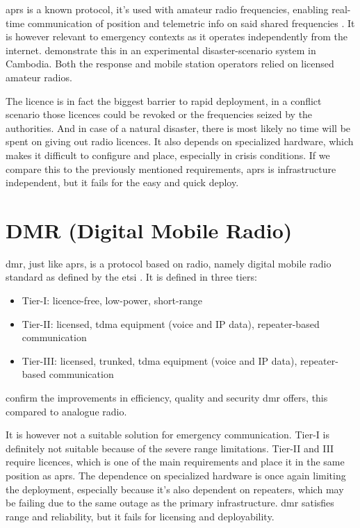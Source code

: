 \gls{aprs} is a known protocol, it's used with amateur radio frequencies, enabling real-time communication of position and telemetric info on said shared frequencies \autocite{UN2023APRS}.
It is however relevant to emergency contexts as it operates independently from the internet. \textcite{UN2023APRS} demonstrate this in an experimental disaster-scenario system in Cambodia. Both the response and mobile station operators relied on licensed amateur radios.

The licence is in fact the biggest barrier to rapid deployment, in a conflict scenario those licences could be revoked or the frequencies seized by the authorities. And in case of a natural disaster, there is most likely no time will be spent on giving out radio licences.
It also depends on specialized hardware, which makes it difficult to configure and place, especially in crisis conditions. If we compare this to the previously mentioned requirements, \gls{aprs} is infrastructure independent, but it fails for the easy and quick deploy.

\section{DMR (Digital Mobile Radio)}%
\label{sec:sota-dmr}

\gls{dmr}, just like \gls{aprs}, is a protocol based on radio, namely digital mobile radio standard as defined by the \gls{etsi} \autocite{ETSI2023DMR}.
It is defined in three tiers:
\begin{itemize}
    \item Tier-I: licence-free, low-power, short-range
    \item Tier-II: licensed, \gls{tdma} equipment (voice and IP data), repeater-based communication 
    \item Tier-III: licensed, trunked, \gls{tdma} equipment (voice and IP data), repeater-based communication
\end{itemize}

\textcite{Nyawose2025DMR} confirm the improvements in efficiency, quality and security \gls{dmr} offers, this compared to analogue radio.

It is however not a suitable solution for emergency communication.
Tier-I is definitely not suitable because of the severe range limitations. Tier-II and III require licences, which is one of the main requirements and place it in the same position as \gls{aprs}.
The dependence on specialized hardware is once again limiting the deployment, especially because it's also dependent on repeaters, which may be failing due to the same outage as the primary infrastructure.
\gls{dmr} satisfies range and reliability, but it fails for licensing and deployability.

